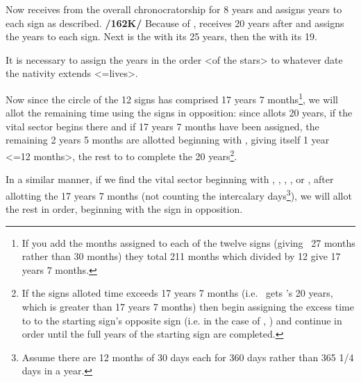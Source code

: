 Now \Venus\xspace receives from \Mars\xspace the overall chronocratorship for 8 years and assigns years to
each sign as described. \textbf{/162K/} Because of \Gemini, \Mercury\xspace receives 20 years after \Venus\xspace and assigns the years to each sign. Next is the \Moon\xspace with its 25 years, then the \Sun\xspace with its 19. 

It is necessary to assign the years in the order <of the stars> to whatever date the nativity extends <=lives>.

Now since the circle of the 12 signs has comprised 17 years 7 months\footnote{If you add the months assigned to each of the twelve signs (giving \Capricorn\, 27 months rather than 30 months) they total 211 months which divided by 12 give 17 years 7 months.}, we will allot the remaining time using the signs in opposition: since \Gemini\xspace allots 20 years, if the vital sector begins there and if 17 years 7 months have been assigned, the remaining 2 years 5 months are allotted beginning with \Sagittarius, giving \Sagittarius\xspace itself 1 year <=12 months>, the rest to \Capricorn\xspace to complete the 20 years\footnote{If the signs alloted time exceeds 17 years 7 months (i.e. \Gemini\, gets \Mercury's 20 years, which is greater than 17 years 7 months) then begin assigning the excess time to to the starting sign's opposite sign (i.e. in the case of \Gemini, \Sagittarius) and continue in order until the full years of the starting sign are completed.}.

In a similar manner, if we find the vital sector beginning with \Cancer, \Leo, \Virgo, \Capricorn, or \Aquarius, after allotting the 17 years 7 months (not counting the intercalary days\footnote{Assume there are 12 months of 30 days each for 360 days rather than 365 1/4 days in a year.}), we will allot the rest in order, beginning with the sign in opposition.

